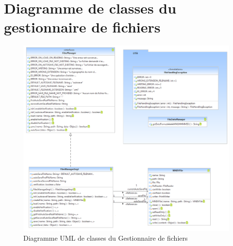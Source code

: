 \documentclass[a4paper,12pt]{report}
\begin{document}
\section{Diagramme de classes du gestionnaire de fichiers}
\label{clsFM}
\begin{figure}[H]
\centering
  \includegraphics[scale=0.5]{Architecture/FilesManager.png}
\caption{Diagramme UML de classes du Gestionnaire de fichiers}
\end{figure}
\end{document}
